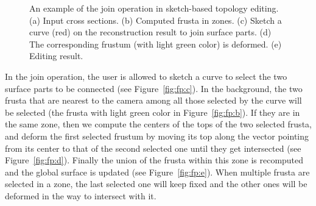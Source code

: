 \begin{figure} [htbp]
{\begin{minipage}[b]{0.18\textwidth}
    \end{minipage}}
  \caption{An example of the join operation in sketch-based topology editing.
  (a) Input cross sections.
  (b) Computed frusta in zones.
  (c) Sketch a curve (red) on the reconstruction result to join surface parts.
  (d) The corresponding frustum (with light green color) is deformed.
  (e) Editing result.}
  \label{fig:fp}
\end{figure}

In the join operation,  the user is allowed to sketch a curve to
select the two surface parts to be connected (see
Figure~\ref{fig:fp:c}). In the background, the two frusta that are
nearest to the camera among all those selected by the curve will be
selected (the frusta with light green color in
Figure~\ref{fig:fp:b}). If they are in the same zone, then we
compute the centers of the tops of the two selected frusta, and
deform the first selected frustum by moving its top along the vector
pointing from its center to that of the second selected one until
they get intersected (see Figure~\ref{fig:fp:d}). Finally the union
of the frusta within this zone is recomputed and the global surface
is updated (see Figure~\ref{fig:fp:e}). When multiple frusta are
selected in a zone, the last selected one will keep fixed and the
other ones will be deformed in the way to intersect with it.

